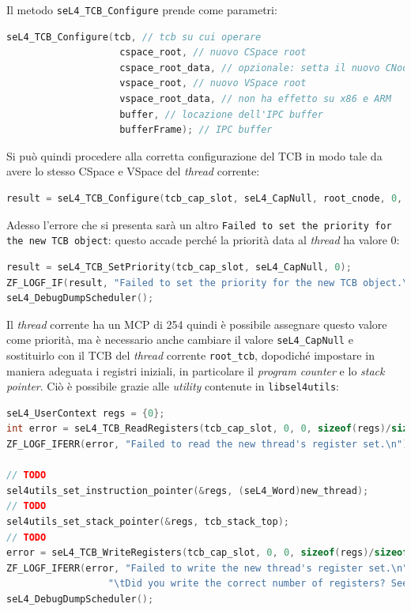 Il metodo \texttt{seL4\_TCB\_Configure} prende come parametri:
\begin{lstlisting}[language=C++]
seL4_TCB_Configure(tcb, // tcb su cui operare
					cspace_root, // nuovo CSpace root
					cspace_root_data, // opzionale: setta il nuovo CNode
					vspace_root, // nuovo VSpace root
					vspace_root_data, // non ha effetto su x86 e ARM
					buffer, // locazione dell'IPC buffer
					bufferFrame); // IPC buffer
\end{lstlisting} 

Si può quindi procedere alla corretta configurazione del TCB in modo tale da avere lo stesso CSpace e VSpace del \textit{thread} corrente:
\begin{lstlisting}[language=C++]
result = seL4_TCB_Configure(tcb_cap_slot, seL4_CapNull, root_cnode, 0, root_vspace, 0, (seL4_Word) thread_ipc_buff_sym, tcb_ipc_frame);
\end{lstlisting}

Adesso l'errore che si presenta sarà un altro
\texttt{Failed to set the priority for the new TCB object}: questo accade perché la priorità data al \textit{thread} ha valore 0:
\begin{lstlisting}[language=C++]
result = seL4_TCB_SetPriority(tcb_cap_slot, seL4_CapNull, 0);
ZF_LOGF_IF(result, "Failed to set the priority for the new TCB object.\n");
seL4_DebugDumpScheduler();
\end{lstlisting}

Il \textit{thread} corrente ha un MCP di 254 quindi è possibile assegnare questo valore come priorità, ma è necessario anche cambiare il valore \texttt{seL4\_CapNull} e sostituirlo con il TCB del \textit{thread} corrente \texttt{root\_tcb}, dopodiché impostare in maniera adeguata i registri iniziali, in particolare il \textit{program counter} e lo \textit{stack pointer}. Ciò è possibile grazie alle \textit{utility} contenute in \texttt{libsel4utils}:
\begin{lstlisting}[language=C++]
seL4_UserContext regs = {0};
int error = seL4_TCB_ReadRegisters(tcb_cap_slot, 0, 0, sizeof(regs)/sizeof(seL4_Word), &regs);
ZF_LOGF_IFERR(error, "Failed to read the new thread's register set.\n");

// TODO
sel4utils_set_instruction_pointer(&regs, (seL4_Word)new_thread);
// TODO
sel4utils_set_stack_pointer(&regs, tcb_stack_top);
// TODO
error = seL4_TCB_WriteRegisters(tcb_cap_slot, 0, 0, sizeof(regs)/sizeof(seL4_Word), &regs);
ZF_LOGF_IFERR(error, "Failed to write the new thread's register set.\n"
                  "\tDid you write the correct number of registers? See arg4.\n");
seL4_DebugDumpScheduler();
\end{lstlisting}

